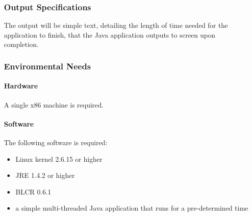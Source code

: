 \subsubsection{Output Specifications}
The output will be simple text, detailing the length of time needed for the application to finish, that the Java application outputs to screen upon completion.

\subsubsection{Environmental Needs}

\paragraph{Hardware}
A single x86 machine is required.

\paragraph{Software}
The following software is required:
\begin{itemize}
\item Linux kernel 2.6.15 or higher
\item JRE 1.4.2 or higher
\item BLCR 0.6.1
\item a simple multi-threaded Java application that runs for a pre-determined time
\end{itemize}


